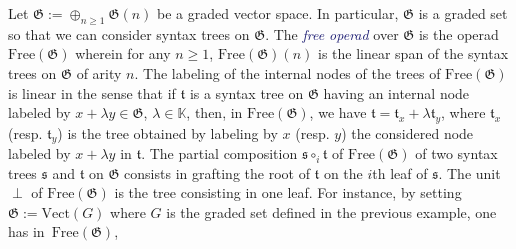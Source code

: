 \documentclass[10pt,reqno]{amsart}
\numberwithin{equation}{subsection}
\renewcommand{\geq}{\geqslant}
\newcommand{\K}{\mathbb{K}}
\newcommand{\Tfr}{\mathfrak{t}}
\newcommand{\Sfr}{\mathfrak{s}}
\newcommand{\Leaf}{\perp}
\newcommand{\Vect}{\mathrm{Vect}}
\newcommand{\Free}{\mathrm{Free}}
\newcommand{\Gen}{\mathfrak{G}}
\newcommand{\Def}[1]{\textcolor{MidnightBlue}{\em #1}}
\begin{document}
Let $\Gen := \oplus_{n \geq 1} \Gen(n)$ be a graded vector space. In
particular, $\Gen$ is a graded set so that we can consider syntax trees
on $\Gen$. The \Def{free operad} over $\Gen$ is the operad $\Free(\Gen)$
wherein for any $n \geq 1$, $\Free(\Gen)(n)$ is the linear span of the
syntax trees on $\Gen$ of arity $n$. The labeling of the internal nodes
of the trees of $\Free(\Gen)$ is linear in the sense that if $\Tfr$ is a
syntax tree on $\Gen$ having an internal node labeled by
$x + \lambda y \in \Gen$, $\lambda \in \K$, then, in $\Free(\Gen)$, we
have $\Tfr = \Tfr_x + \lambda \Tfr_y$, where $\Tfr_x$ (resp. $\Tfr_y$)
is the tree obtained by labeling by $x$ (resp. $y$) the considered node
labeled by $x + \lambda y$ in $\Tfr$. The partial composition
$\Sfr \circ_i \Tfr$ of $\Free(\Gen)$ of two syntax trees $\Sfr$ and
$\Tfr$ on $\Gen$ consists in grafting the root of $\Tfr$ on the $i$th
leaf of $\Sfr$. The unit $\Leaf$ of $\Free(\Gen)$ is the tree consisting
in one leaf. For instance, by setting $\Gen := \Vect(G)$ where $G$ is
the graded set defined in the previous example, one has in~$\Free(\Gen)$,
\end{document}
